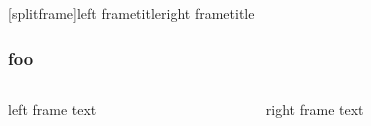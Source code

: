\documentclass{beamer}
\begin{document}
\begingroup
{}[splitframe]{left frametitle}{right frametitle}
\begin{frame}
\frametitle{foo} %
\begin{columns}[onlytextwidth,T]
    \begin{column}{.48\textwidth}
        left frame text
    \end{column}
    \begin{column}{.48\textwidth}
        right frame text
    \end{column}
\end{columns}
\end{frame}
\endgroup
\end{document}
